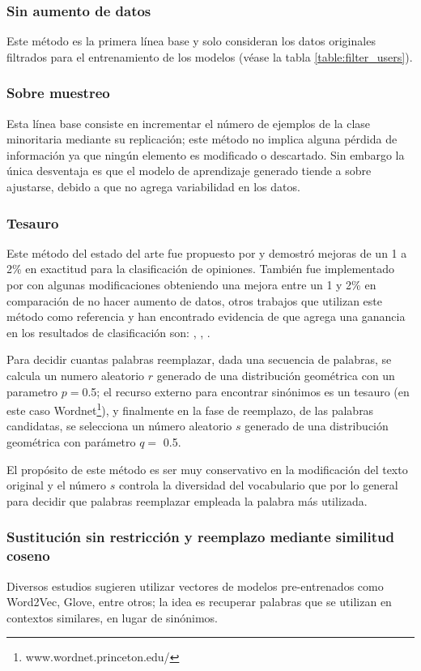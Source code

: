\subsubsection{Sin aumento de datos}
Este método es la primera línea base y solo consideran los datos originales filtrados para el entrenamiento de los modelos (véase la tabla \ref{table:filter_users}).

\subsubsection{Sobre muestreo}
Esta línea base consiste en incrementar el número de ejemplos de la clase minoritaria mediante su replicación; este método no implica alguna pérdida de información ya que ningún elemento es modificado o descartado. Sin embargo la única desventaja es que el modelo de aprendizaje generado tiende a sobre ajustarse, debido a que no agrega variabilidad en los datos.

\subsubsection{Tesauro}
Este método del estado del arte fue propuesto por \citep{zhang2015character} y demostró mejoras de un 1 a 2\% en exactitud para la clasificación de opiniones. También fue implementado por \citep{wei2019eda} con algunas modificaciones obteniendo una mejora entre un 1 y 2\% en comparación de no hacer aumento de datos, otros trabajos que utilizan este método como referencia y han encontrado evidencia de que agrega una ganancia en los resultados de clasificación son: \citep{jungiewicz2019towards}, \citep{kumar2019submodular}, \citep{park2019self}.

Para decidir cuantas palabras reemplazar, dada una secuencia de palabras, se calcula un numero aleatorio $r$ generado de una distribución geométrica con un parametro $p=$0.5; el recurso externo para encontrar sinónimos es un tesauro (en este caso Wordnet\footnote{www.wordnet.princeton.edu/}), y finalmente en la fase de reemplazo, de las palabras candidatas, se selecciona un número aleatorio $s$ generado de una distribución geométrica con parámetro $q=$ 0.5.

El propósito de este método es ser muy conservativo en la modificación del texto original y el número $s$ controla la diversidad del vocabulario que por lo general para decidir que palabras reemplazar empleada la palabra más utilizada.

\subsubsection{Sustitución sin restricción y reemplazo mediante similitud coseno}
Diversos estudios sugieren utilizar vectores de modelos pre-entrenados como Word2Vec, Glove, entre otros; la idea es recuperar palabras que se utilizan en contextos similares, en lugar de sinónimos. 

